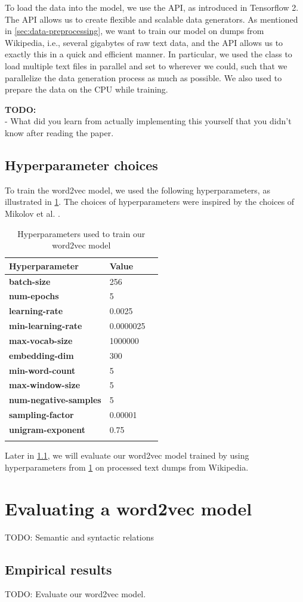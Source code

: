 To load the data into the model, we use the  API, as introduced in Tensorflow 2. The  API allows us to create flexible and scalable data generators. As mentioned in \cref{sec:data-preprocessing}, we want to train our model on dumps from Wikipedia, i.e., several gigabytes of raw text data, and the  API allows us to exactly this in a quick and efficient manner. In particular, we used the  class to load multiple text files in parallel and set  to  wherever we could, such that we parallelize the data generation process as much as possible. We also used  to prepare the data on the CPU while training.

\textbf{TODO:} \\
- What did you learn from actually implementing this yourself that you didn't know after reading the paper. \\

\subsection{Hyperparameter choices}
To train the word2vec model, we used the following hyperparameters, as illustrated in \cref{table:word2vec-hyperparameter-choices}. The choices of hyperparameters were inspired by the choices of Mikolov et al. \cite{mikolov2013a, mikolov2013b}.

\begin{longtable}[]{@{}lll@{}}
\toprule
Hyperparameter & Value\tabularnewline
\midrule
\endhead
\textbf{batch-size} & 256\tabularnewline
\textbf{num-epochs} & 5\tabularnewline
\textbf{learning-rate} & 0.0025\tabularnewline
\textbf{min-learning-rate} & 0.0000025\tabularnewline
\textbf{max-vocab-size} & 1000000\tabularnewline
\textbf{embedding-dim} & 300\tabularnewline
\textbf{min-word-count} & 5\tabularnewline
\textbf{max-window-size} & 5\tabularnewline
\textbf{num-negative-samples} & 5\tabularnewline
\textbf{sampling-factor} & 0.00001\tabularnewline
\textbf{unigram-exponent} & 0.75\tabularnewline
\bottomrule
\caption{Hyperparameters used to train our word2vec model}
\label{table:word2vec-hyperparameter-choices}
\end{longtable}

Later in \cref{sec:word2vec-eval-empirical-results}, we will evaluate our word2vec model trained by using hyperparameters from \cref{table:word2vec-hyperparameter-choices} on processed text dumps from Wikipedia.

\section{Evaluating a word2vec model}
\label{sec:eval-word2vec-model}
TODO: Semantic and syntactic relations

\subsection{Empirical results}
\label{sec:word2vec-eval-empirical-results}
TODO: Evaluate our word2vec model.